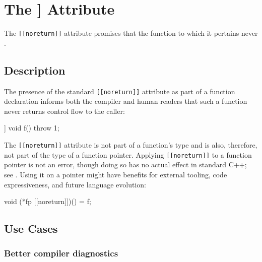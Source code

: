 \newpage
\section[{\tt noreturn}]{The {\SecCode [[noreturn]]} Attribute}\label{the-noreturn-attribute}


The \lstinline![[noreturn]]! attribute promises that the function to which
it pertains never .

\subsection[Description]{Description}\label{description}

The presence of the standard \lstinline![[noreturn]]! attribute as part of
a function declaration informs both the compiler and human readers that
such a function never returns control flow to the caller:

\begin{emcppslisting}[emcppsbatch=e1]
[[noreturn]] void f()
{
    throw 1;
}
\end{emcppslisting}


\noindent The \lstinline![[noreturn]]! attribute is not part of a function's type
and is also, therefore, not part of the type of a function pointer. Applying \lstinline![[noreturn]]! to a function
pointer is not an error, though doing so has no actual effect in standard C++; see
. Using it on a pointer might have
benefits for external tooling, code expressiveness, and future language
evolution:

\begin{emcppslisting}[emcppsbatch=e1]
void (*fp [[noreturn]])() = f;
\end{emcppslisting}


\subsection[Use Cases]{Use Cases}\label{use-cases}

\subsubsection[Better compiler diagnostics]{Better compiler diagnostics}\label{better-compiler-diagnostics}

